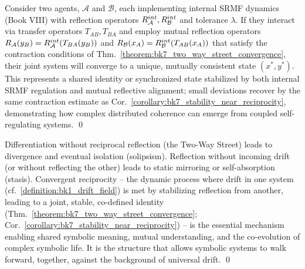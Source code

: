 \begin{scholium}
\label{scholium:bk7_srmf_coupled_agents}
Consider two agents, \(\mathcal{A}\) and \(\mathcal{B}\), each implementing internal SRMF dynamics (Book VIII) with reflection operators \(R_{\mathcal{A}}^{int}, R_{\mathcal{B}}^{int}\) and tolerance \(\lambda\). If they interact via transfer operators \(T_{AB}, T_{BA}\) and employ mutual reflection operators \(R_{\mathcal{A}}(y_B) = R_{\mathcal{A}}^{int}(T_{BA}(y_B))\) and \(R_{\mathcal{B}}(x_A) = R_{\mathcal{B}}^{int}(T_{AB}(x_A))\) that satisfy the contraction conditions of Thm.~\ref{theorem:bk7_two_way_street_convergence}, their joint system will converge to a unique, mutually consistent state \((x^{\ast}, y^{\ast})\). This represents a shared identity or synchronized state stabilized by both internal SRMF regulation and mutual reflective alignment; small deviations recover by the same contraction estimate as Cor.~\ref{corollary:bk7_stability_near_reciprocity}, demonstrating how complex distributed coherence can emerge from coupled self-regulating systems. \qed \end{scholium}
\begin{scholium}
\label{scholium:bk7_on_symbolic_reciprocity}
Differentiation without reciprocal reflection (the Two-Way Street) leads to divergence and eventual isolation (solipsism). Reflection without incoming drift (or without reflecting the other) leads to static mirroring or self-absorption (stasis). Convergent reciprocity -- the dynamic process where drift in one system (cf.~\ref{definition:bk1_drift_field}) is met by stabilizing reflection from another, leading to a joint, stable, co-defined identity (Thm.~\ref{theorem:bk7_two_way_street_convergence}; Cor.~\ref{corollary:bk7_stability_near_reciprocity}) -- is the essential mechanism enabling shared symbolic meaning, mutual understanding, and the co-evolution of complex symbolic life. It is the structure that allows symbolic systems to walk forward, together, against the background of universal drift. \qed
\end{scholium}

